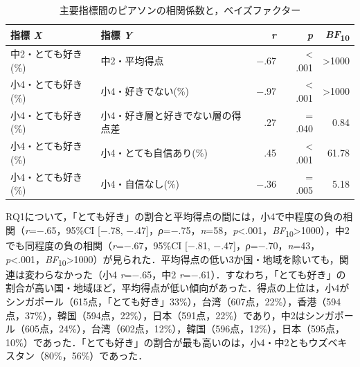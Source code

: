 \documentclass[a4paper,10pt,twocolumn]{ltjsarticle}
\makeatletter
\renewcommand{\section}{\@startsection{section}{1}{\z@}{1.1\Cvs \@plus.4\Cdp \@minus.2\Cdp}{.5\Cvs \@plus.2\Cdp}{\normalfont\gtfamily\bfseries\large}}
\makeatother
\begin{document}
\begin{table}[!t]
\caption{主要指標間のピアソンの相関係数と，ベイズファクター}
\centering\small
\begin{tabular}{>{\raggedright\arraybackslash}p{6.4cm}>{\raggedright\arraybackslash}p{6.4cm}rrr}
\toprule
指標 \textit{X} & 指標 \textit{Y} & \textit{r} & \textit{p} & \textit{BF}\textsubscript{10} \\
\midrule
中2・とても好き(\%) & 中2・平均得点 & −.67 & < .001 & >1000 \\
小4・とても好き(\%) & 小4・好きでない(\%) & −.97 & < .001 & >1000 \\
小4・とても好き(\%) & 小4・好き層と好きでない層の得点差 & .27 & = .040 & 0.84 \\
小4・とても好き(\%) & 小4・とても自信あり(\%) & .45 & < .001 & 61.78 \\
小4・とても好き(\%) & 小4・自信なし(\%) & −.36 & = .005 & 5.18 \\
\bottomrule
\end{tabular}
\par{}
\end{table}
\section{結果}
RQ1について，「とても好き」の割合と平均得点の間には，小4で中程度の負の相関（\textit{r}=−.65，95\%CI [−.78, −.47]，\textit{ρ}=−.75，\textit{n}=58，\textit{p}<.001，\textit{BF}\textsubscript{10}>1000），中2でも同程度の負の相関（\textit{r}=−.67，95\%CI [−.81, −.47]，\textit{ρ}=−.70，\textit{n}=43，\textit{p}<.001，\textit{BF}\textsubscript{10}>1000）が見られた．平均得点の低い3か国・地域を除いても，関連は変わらなかった（小4 \textit{r}=−.65，中2 \textit{r}=−.61）．すなわち，「とても好き」の割合が高い国・地域ほど，平均得点が低い傾向があった．得点の上位は，小4がシンガポール（615点，「とても好き」33\%），台湾（607点，22\%），香港（594点，37\%），韓国（594点，22\%），日本（591点，22\%）であり，中2はシンガポール（605点，24\%），台湾（602点，12\%），韓国（596点，12\%），日本（595点，10\%）であった．「とても好き」の割合が最も高いのは，小4・中2ともウズベキスタン（80\%，56\%）であった．
\end{document}

